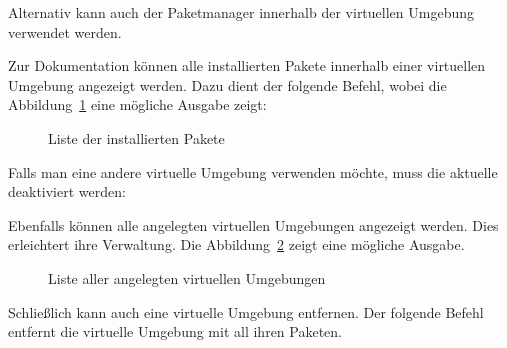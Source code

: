   \medskip
     
Alternativ kann auch der Paketmanager innerhalb der virtuellen Umgebung verwendet werden.
     
     \medskip
     
     
\medskip
     
Zur Dokumentation können alle installierten Pakete innerhalb einer virtuellen Umgebung angezeigt werden. Dazu dient der folgende Befehl, wobei die Abbildung~\ref{env:list} eine mögliche Ausgabe zeigt:
     
     \medskip
     
     
\medskip
     
     
  	\begin{figure}
  	
  	\caption{Liste der installierten Pakete}
  	
  	\label{env:list}  
  \end{figure}

Falls man eine andere virtuelle Umgebung verwenden möchte, muss die aktuelle deaktiviert werden:

  \medskip


\medskip

     
     
Ebenfalls können alle angelegten virtuellen Umgebungen angezeigt werden. Dies erleichtert ihre Verwaltung.
Die Abbildung~\ref{env:envlist} zeigt eine mögliche Ausgabe.

\medskip
     

\medskip

\begin{figure}
	
	\caption{Liste aller angelegten virtuellen Umgebungen}
	\label{env:envlist}  
\end{figure}

 
Schließlich kann auch eine virtuelle Umgebung entfernen. Der folgende Befehl entfernt die virtuelle Umgebung  mit all ihren Paketen. 
 
  \medskip
   
  

